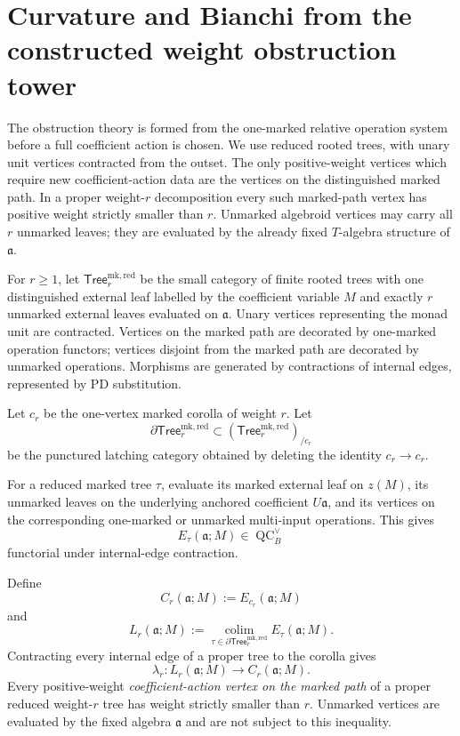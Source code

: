 \section{Curvature and Bianchi from the constructed weight obstruction tower}
\label{sec:as-curvature}

The obstruction theory is formed from the one-marked relative operation
system before a full coefficient action is chosen.  We use reduced rooted
trees, with unary unit vertices contracted from the outset.  The only
positive-weight vertices which require new coefficient-action data are the
vertices on the distinguished marked path.  In a proper weight-$r$
decomposition every such marked-path vertex has positive weight strictly
smaller than $r$.  Unmarked algebroid vertices may carry all $r$ unmarked
leaves; they are evaluated by the already fixed $T$-algebra structure of
$\mathfrak a$.

\begin{definition}
\label{def:as-marked-rooted-tree-category}
For $r\geq1$, let $\mathsf{Tree}^{\mathrm{mk,red}}_r$ be the small category of
finite rooted trees with one distinguished external leaf labelled by the
coefficient variable $M$ and exactly $r$ unmarked external leaves evaluated on
$\mathfrak a$.  Unary vertices representing the monad unit are contracted.
Vertices on the marked path are decorated by one-marked operation functors;
vertices disjoint from the marked path are decorated by unmarked operations.
Morphisms are generated by contractions of internal edges, represented by PD
substitution.

Let $c_r$ be the one-vertex marked corolla of weight $r$.  Let
\[
    \partial\mathsf{Tree}^{\mathrm{mk,red}}_r
    \subset
    (\mathsf{Tree}^{\mathrm{mk,red}}_r)_{/c_r}
\]
be the punctured latching category obtained by deleting the identity
$c_r\to c_r$.
\end{definition}

\begin{construction}
\label{con:as-preaction-rooted-bar}
For a reduced marked tree $\tau$, evaluate its marked external leaf on
$z(M)$, its unmarked leaves on the underlying anchored coefficient
$U\mathfrak a$, and its vertices on the corresponding one-marked or unmarked
multi-input operations.  This gives
\[
    E_\tau(\mathfrak a;M)\in\operatorname{QC}^{\vee}_B
\]
functorial under internal-edge contraction.

Define
\[
\boxed{
    C_r(\mathfrak a;M):=E_{c_r}(\mathfrak a;M)
}
\]
and
\[
\boxed{
    L_r(\mathfrak a;M)
    :=
    \operatorname*{colim}_{\tau\in
      \partial\mathsf{Tree}^{\mathrm{mk,red}}_r}
    E_\tau(\mathfrak a;M).
}
\]
Contracting every internal edge of a proper tree to the corolla gives
\[
\boxed{
    \lambda_r:
    L_r(\mathfrak a;M)
    \longrightarrow
    C_r(\mathfrak a;M).
}
\]
Every positive-weight \emph{coefficient-action vertex on the marked path} of a
proper reduced weight-$r$ tree has weight strictly smaller than $r$.
Unmarked vertices are evaluated by the fixed algebra $\mathfrak a$ and are not
subject to this inequality.
\end{construction}

